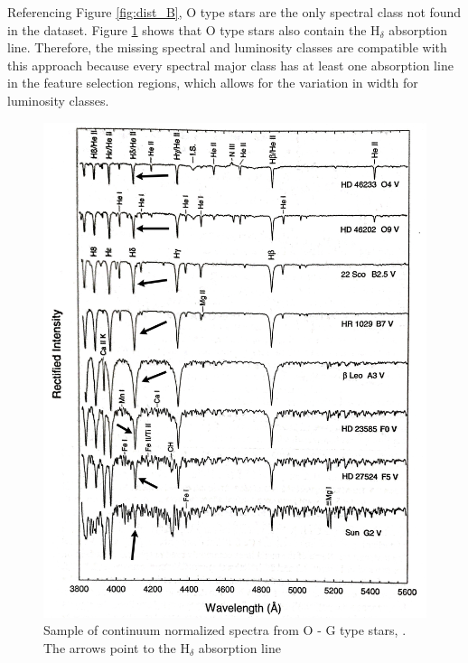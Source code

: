 \documentclass[trackchanges, floatfix, twocolumn, tighten]{aastex62}
\begin{document}
Referencing Figure \ref{fig:dist_B}, O type stars are the only spectral class not found in the dataset. Figure \ref{fig:O} shows that O type stars also contain the H$_\delta$ absorption line. Therefore, the missing spectral and luminosity classes are compatible with this approach because every spectral major class has at least one absorption line in the feature selection regions, which allows for the variation in width for luminosity classes.


        \begin{figure}
            \centering
             \includegraphics[width=1\linewidth]{figures/OStar.jpeg}
            \caption{Sample of continuum normalized spectra from O - G type stars, \cite{Gray}. The arrows point to the H$_\delta$ absorption line}
            \label{fig:O}
        \end{figure}
\end{document}

